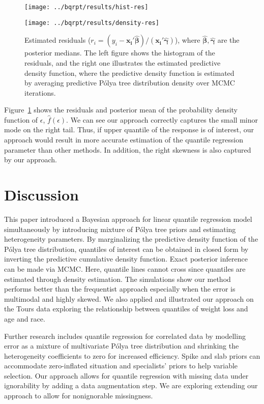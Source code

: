\documentclass[12pt]{article}
\newcommand{\polya}{P\'{o}lya}
\begin{document}
\begin{figure}[htbp]
  \begin{minipage}{0.5\linewidth}
    \centerline{\texttt{[image: ../bqrpt/results/hist-res]}}
  \end{minipage}
  \begin{minipage}{0.5\linewidth}
    \centerline{\texttt{[image: ../bqrpt/results/density-res]}}
  \end{minipage}
  \caption[]{\label{fig:tourpost} Estimated residuals ($r_i = (y_i-
    \bm{x_i'\hat{\beta}})/(\bm{x_i'\hat{\gamma}})$), where
    $\hat{\bm{\beta}}, \hat{\bm{\gamma}}$ are the posterior
    medians. The left figure shows the histogram of the residuals, and
    the right one illustrates the estimated predictive density
    function, where the predictive density function is estimated by
    averaging predictive \polya{} tree distribution density over MCMC
    iterations.}
\end{figure}

Figure~\ref{fig:tourpost} shows the residuals and posterior mean of
the probability density function of $\epsilon$,
$\hat{f}(\epsilon)$. We can see our approach correctly captures the
small minor mode on the right tail. Thus, if upper quantile of the
response is of interest, our approach would result in more accurate
estimation of the quantile regression parameter than other methods. In
addition, the right skewness is also captured by our approach.

\section{Discussion}
\label{sec:discussion}
This paper introduced a Bayesian approach for linear quantile
regression model simultaneously by introducing mixture of \polya{}
tree priors and estimating heterogeneity parameters. By marginalizing
the predictive density function of the \polya{} tree distribution,
quantiles of interest can be obtained in closed form by inverting the
predictive cumulative density function. Exact posterior inference can
be made via MCMC. Here, quantile lines cannot cross since quantiles
are estimated through density estimation.  The simulations show our
method performs better than the frequentist approach especially when
the error is multimodal and highly skewed. We also applied and
illustrated our approach on the Tours data exploring the relationship
between quantiles of weight loss and age and race.

Further research includes quantile regression for correlated data by
modelling error as a mixture of multivariate \polya{} tree
distribution and shrinking the heterogeneity coefficients to zero for
increased efficiency.  Spike and slab priors can accommodate
zero-inflated situation and specialists' priors to help variable
selection. Our approach allows for quantile regression with missing
data under ignorability by adding a data augmentation step.  We are
exploring extending our approach to allow for nonignorable
missingness.
\end{document}

